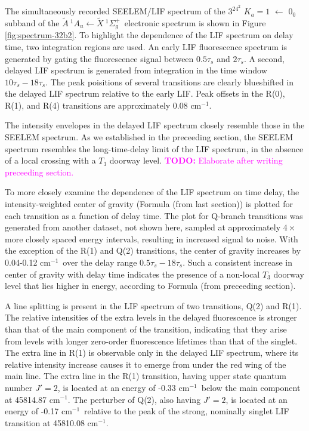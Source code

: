 \documentclass[12pt]{mitthesis}
\newcommand{\TODO} [1]{\textcolor{magenta}{\textbf{TODO:} #1}}
\newcommand{\rcm}{cm$^{-1}$}
\newcommand{\AtoX}{$
  \tilde{A} \: ^1\!A_u 
  \leftarrow 
  \tilde{X} \: ^1\Sigma_g^+
  $}
\newcommand{\Ka}[1]{$K_a\!\!=\!#1$}
\begin{document}
The simultaneously recorded SEELEM/LIF spectrum of the $3^24^2$ \Ka{1}
$\leftarrow$ $0_0$ subband of the \AtoX\ electronic spectrum is shown
in Figure \ref{fig:spectrum-32b2}. To highlight the dependence of the
LIF spectrum on delay time, two integration regions are used.  An
early LIF fluorescence spectrum is generated by gating the
fluorescence signal between $0.5\tau_s$ and $2\tau_s$.  A second,
delayed LIF spectrum is generated from integration in the time window
$10\tau_s-18\tau_s$.  The peak poisitions of several transitions are
clearly blueshifted in the delayed LIF spectrum relative to the early
LIF.  Peak offsets in the R(0), R(1), and R(4) transitions are
approximately 0.08 \rcm.

The intensity envelopes in the delayed LIF spectrum closely resemble
those in the SEELEM spectrum.  As we established in the preceeding
section, the SEELEM spectrum resembles the long-time-delay limit of
the LIF spectrum, in the absence of a local crossing with a $T_3$
doorway level.  \TODO{Elaborate after writing preceeding section.}

To more closely examine the dependence of the LIF spectrum on time
delay, the intensity-weighted center of gravity (Formula (from last
section)) is plotted for each transition as a function of delay time.
The plot for Q-branch transitions was generated from another dataset,
not shown here, sampled at approximately $4 \times$ more closely
spaced energy intervals, resulting in increased signal to noise.  With
the exception of the R(1) and Q(2) transitions, the center of gravity
increases by 0.04-0.12 \rcm\ over the delay range
$0.5\tau_s-18\tau_s$.  Such a consistent increase in center of gravity
with delay time indicates the presence of a non-local $T_3$ doorway
level that lies higher in energy, according to Formula (from
preceeding section).


A line splitting is present in the LIF spectrum of two transitions,
Q(2) and R(1).  The relative intensities of the extra levels in the
delayed fluorescence is stronger than that of the main component of
the transition, indicating that they arise from levels with longer
zero-order fluorescence lifetimes than that of the singlet.  The extra
line in R(1) is observable only in the delayed LIF spectrum, where its
relative intensity increase causes it to emerge from under the red
wing of the main line.  The extra line in the R(1) transition, having
upper state quantum number $J'=2$, is located at an energy of -0.33
\rcm\ below the main component at 45814.87 \rcm.  The perturber of
Q(2), also having $J'=2$, is located at an energy of -0.17 \rcm\
relative to the peak of the strong, nominally singlet LIF transition
at 45810.08 \rcm.
\end{document}
